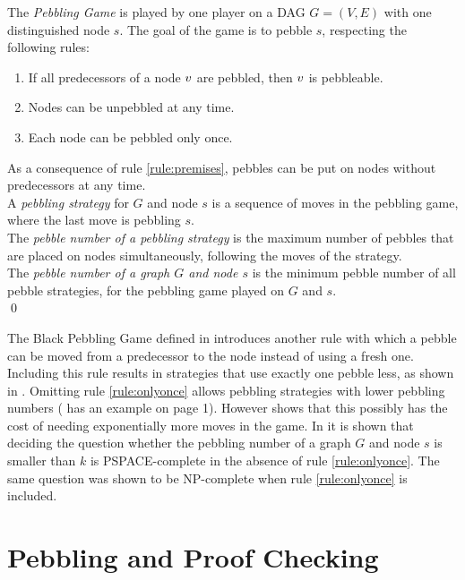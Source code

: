 \documentclass{llncs}
\begin{document}
\begin{definition}
\label{def:pebbling-game}
The \emph{Pebbling Game} is played by one player on a DAG $G = (V,E)$ with one distinguished node $s$.
The goal of the game is to pebble $s$, respecting the following rules:
\begin{enumerate}
	\item \label{rule:premises} If all predecessors of a node $v$ are pebbled, then $v$ is pebbleable.
	\item Nodes can be unpebbled at any time.
	\item \label{rule:onlyonce} Each node can be pebbled only once.
\end{enumerate}
As a consequence of rule \ref{rule:premises}, pebbles can be put on nodes without predecessors at any time.\\
A \emph{pebbling strategy} for $G$ and node $s$ is a sequence of moves in the pebbling game, where the last move is pebbling $s$.\\
The \emph{pebble number of a pebbling strategy} is the maximum number of pebbles that are placed on nodes simultaneously, following the moves of the strategy.\\
The \emph{pebble number of a graph $G$ and node $s$} is the minimum pebble number of all pebble strategies, for the pebbling game played on $G$ and $s$.\\
\qed
\end{definition}


The Black Pebbling Game defined in \cite{hertel2007black,pippenger1982advances} introduces another rule with which a pebble can be moved from a predecessor to the node instead of using a fresh one.
Including this rule results in strategies that use exactly one pebble less, as shown in \cite{van1979move}.
Omitting rule \ref{rule:onlyonce} allows pebbling strategies with lower pebbling numbers (\cite{sethi1975complete} has an example on page 1).
However \cite{van1979move} shows that this possibly has the cost of needing exponentially more moves in the game.
In \cite{gilbert1980pebbling} it is shown that deciding the question whether the pebbling number of a graph $G$ and node $s$ is smaller than $k$ is PSPACE-complete in the absence of rule \ref{rule:onlyonce}.
The same question was shown to be NP-complete \cite{sethi1975complete} when rule \ref{rule:onlyonce} is included. %



\section{Pebbling and Proof Checking}
\end{document}
